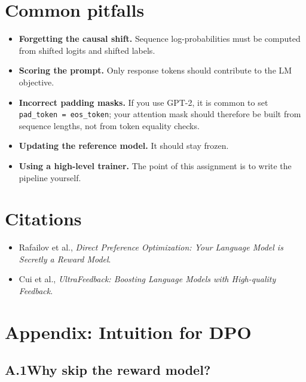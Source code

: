 \documentclass[11pt]{article}
\begin{document}
\section*{Common pitfalls}\label{sec:common-pitfalls}

\begin{itemize}[itemsep=0.35em]
    \item \textbf{Forgetting the causal shift.} Sequence log-probabilities must be computed from shifted logits and shifted labels.
    \item \textbf{Scoring the prompt.} Only response tokens should contribute to the LM objective.
    \item \textbf{Incorrect padding masks.} If you use GPT-2, it is common to set \texttt{pad\_token = eos\_token}; your attention mask should therefore be built from sequence lengths, not from token equality checks.
    \item \textbf{Updating the reference model.} It should stay frozen.
    \item \textbf{Using a high-level trainer.} The point of this assignment is to write the pipeline yourself.
\end{itemize}

\section*{Citations}

\begin{itemize}[itemsep=0.25em]
    \item Rafailov et al., \emph{Direct Preference Optimization: Your Language Model is Secretly a Reward Model}.
    \item Cui et al., \emph{UltraFeedback: Boosting Language Models with High-quality Feedback}.
\end{itemize}

\newpage
\appendix
\section*{Appendix: Intuition for DPO}\label{app:dpo-intuition}

\subsection*{A.1\quad Why skip the reward model?}
\end{document}
